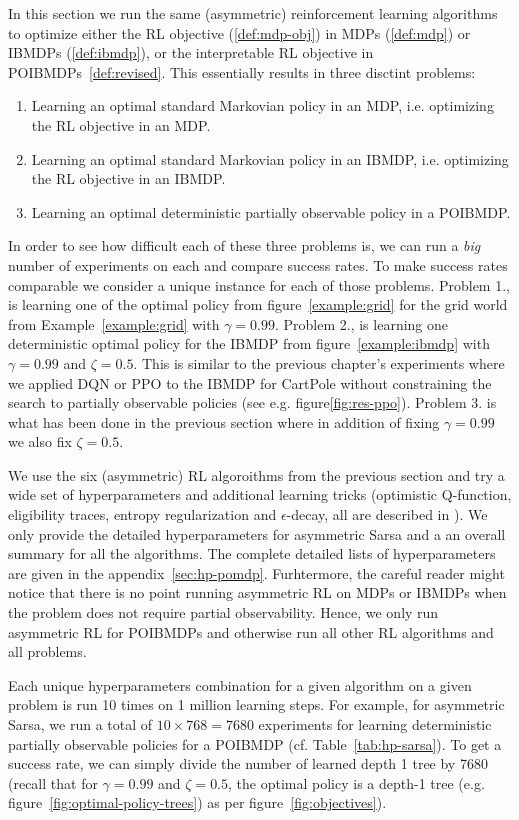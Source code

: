In this section we run the same (asymmetric) reinforcement learning algorithms to optimize either the RL objective (\ref{def:mdp-obj}) in MDPs (\ref{def:mdp}) or IBMDPs (\ref{def:ibmdp}), or the interpretable RL objective in POIBMDPs~\ref{def:revised}.
This essentially results in three disctint problems:
\begin{enumerate}
    \item Learning an optimal standard Markovian policy in an MDP, i.e. optimizing the RL objective in an MDP.
    \item Learning an optimal standard Markovian policy in an IBMDP, i.e. optimizing the RL objective in an IBMDP.
    \item Learning an optimal deterministic partially observable policy in a POIBMDP.
\end{enumerate}

In order to see how difficult each of these three problems is, we can run a \textit{big} number of experiments on each and compare success rates.
To make success rates comparable we consider a unique instance for each of those problems.
Problem 1., is learning one of the optimal policy from figure~\ref{example:grid} for the grid world from Example~\ref{example:grid} with $\gamma=0.99$.
Problem 2., is learning one deterministic optimal policy for the IBMDP from figure~\ref{example:ibmdp} with $\gamma=0.99$ and $\zeta=0.5$.
This is similar to the previous chapter's experiments where we applied DQN or PPO to the IBMDP for CartPole without constraining the search to partially observable policies (see e.g. figure\ref{fig:res-ppo}).
Problem 3. is what has been done in the previous section where in addition of fixing $\gamma=0.99$ we also fix $\zeta=0.5$.

We use the six (asymmetric) RL algoroithms from the previous section and try a wide set of hyperparameters and additional learning tricks (optimistic Q-function, eligibility traces, entropy regularization and $\epsilon$-decay, all are described in \cite{sutton}).
We only provide the detailed hyperparameters for asymmetric Sarsa and a an overall summary for all the algorithms.
The complete detailed lists of hyperparameters are given in the appendix~\ref{sec:hp-pomdp}.
Furhtermore, the careful reader might notice that there is no point running asymmetric RL on MDPs or IBMDPs when the problem does not require partial observability.
Hence, we only run asymmetric RL for POIBMDPs and otherwise run all other RL algorithms and all problems.

Each unique hyperparameters combination for a given algorithm on a given problem is run 10 times on 1 million learning steps.
For example, for asymmetric Sarsa, we run a total of $10\times 768= 7680$ experiments for learning deterministic partially observable policies for a POIBMDP (cf. Table~\ref{tab:hp-sarsa}).
To get a success rate, we can simply divide the number of learned depth 1 tree by 7680 (recall that for $\gamma=0.99$ and $\zeta=0.5$, the optimal policy is a depth-1 tree (e.g. figure~\ref{fig:optimal-policy-trees}) as per figure~\ref{fig:objectives}). 

